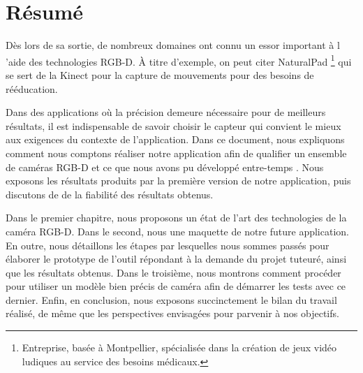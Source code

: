 \documentclass[a4paper, 12pt]{book}
\newcounter{program}[subsection]
\begin{document}
\chapter*{Résumé}
Dès lors de sa sortie, de nombreux domaines ont connu un essor important à l 'aide des technologies RGB-D. À titre d'exemple, on peut citer NaturalPad \footnote{Entreprise, basée à Montpellier, spécialisée dans la création de jeux vidéo ludiques au service des besoins médicaux.} qui se sert de la Kinect pour la capture de mouvements pour des besoins de rééducation.	
\par Dans des applications où la précision demeure nécessaire pour de meilleurs résultats, il est indispensable de savoir choisir le capteur qui convient le mieux aux exigences du contexte de l'application.
Dans ce document, nous expliquons comment nous comptons réaliser notre application afin de qualifier un ensemble de caméras RGB-D et ce que nous avons pu développé entre-temps . Nous exposons les résultats produits par la première version de notre application, puis discutons de de la fiabilité des résultats obtenus.
\par Dans le premier chapitre, nous proposons un état de l'art des technologies de la caméra RGB-D. Dans le second, nous une maquette de notre future application. En outre, nous détaillons les étapes par lesquelles nous sommes passés pour élaborer le prototype de l'outil répondant à la demande du projet tuteuré, ainsi que les résultats obtenus. Dans le troisième, nous montrons comment procéder pour utiliser un modèle bien précis de caméra afin de démarrer les tests avec ce dernier. Enfin, en conclusion, nous exposons succinctement le bilan du travail réalisé, de même que les perspectives envisagées pour parvenir à nos objectifs.

\tableofcontents
\listoffigures
\mainmatter
\end{document}
